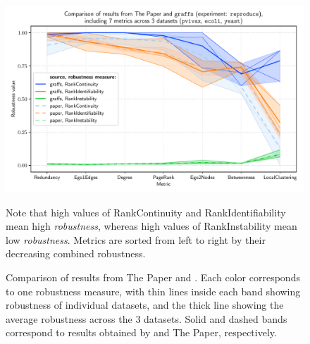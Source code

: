 \begin{figure}
    \includegraphics[width=\linewidth]{plot_reproduction.pdf}
    \caption{Comparison of results from The Paper and \graffs.
    Each color corresponds to one robustness measure, with thin lines inside each band showing robustness of individual datasets, and the thick line showing the average robustness across the 3 datasets.
    Solid and dashed bands correspond to results obtained by \graffs and The Paper, respectively.}
    \label{fig:plot_reproduction}
    \footnotesize
    \begin{flushleft}
        Note that high values of RankContinuity and RankIdentifiability mean high \textsl{robustness}, whereas high values of RankInstability mean low \textsl{robustness}.
        Metrics are sorted from left to right by their decreasing combined robustness.
    \end{flushleft}
\end{figure}
